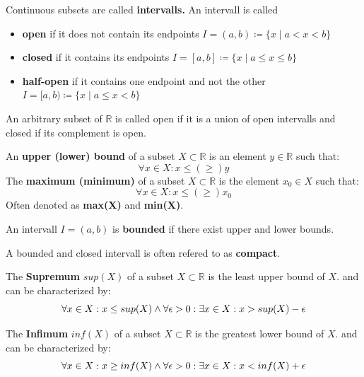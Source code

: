 \begin{definition}
    Continuous subsets are called \textbf{intervalls.} An intervall is called
    \begin{itemize}
        \item \textbf{open} if it does not contain its endpoints $I = (a, b) \coloneqq \{x \mid a \lt x \lt b\}$
        \item \textbf{closed} if it contains its endpoints $I = [a, b] \coloneqq \{x \mid a \leq x \leq b\}$
        \item \textbf{half-open} if it contains one endpoint and not the other $I = [a, b) \coloneqq \{x \mid a \leq x \lt b\}$
    \end{itemize}
\end{definition}

\begin{remark}
    An arbitrary subset of $\mathbb{R}$ is called open if it is a union of open intervalls and closed if its complement is open.
\end{remark}

\begin{definition}
    An \textbf{upper (lower) bound} of a subset $X \subset \mathbb{R}$ is an element $y \in \mathbb{R}$ such that:
    $$\forall x \in X: x \leq (\geq) y$$
    The \textbf{maximum (minimum)} of a subset $X \subset \mathbb{R}$ is the element $x_{0} \in X$ such that:
    $$\forall x \in X: x \leq (\geq) x_{0}$$
    Often denoted as \textbf{max(X)} and \textbf{min(X)}.
\end{definition}

\begin{definition}
    An intervall $I = (a, b)$ is \textbf{bounded} if there exist upper and lower bounds.
\end{definition}

\begin{remark}
    A bounded and closed intervall is often refered to as \textbf{compact}.
\end{remark}
\begin{definition}
    The \textbf{Supremum} $sup(X)$ of a subset $X \subset \mathbb{R}$ is the least upper bound of $X$. and can be characterized by:
    $$\forall x \in X: x \leq sup(X) \land \\ \forall \epsilon > 0: \exists x \in X: x > sup(X) - \epsilon$$
\end{definition}

\begin{definition}
    The \textbf{Infimum} $inf(X)$ of a subset $X \subset \mathbb{R}$ is the greatest lower bound of $X$. and can be characterized by:
    $$\forall x \in X: x \geq inf(X) \land \\ \forall \epsilon > 0: \exists x \in X: x < inf(X) + \epsilon$$
\end{definition}

